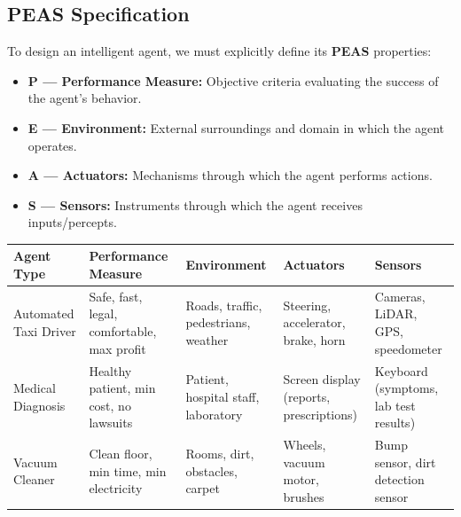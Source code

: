 \documentclass[12pt,a4paper]{article}
\renewcommand{\arraystretch}{1.45}
\begin{document}
\begin{tcolorbox}[tikzbox, title={Agent-Environment Interaction Loop}]
\centering
{}
\end{tcolorbox}

\subsection{PEAS Specification}
To design an intelligent agent, we must explicitly define its \textbf{PEAS} properties:
\begin{itemize}[leftmargin=*, itemsep=3pt]
  \item \textbf{P --- Performance Measure:} Objective criteria evaluating the success of the agent's behavior.
  \item \textbf{E --- Environment:} External surroundings and domain in which the agent operates.
  \item \textbf{A --- Actuators:} Mechanisms through which the agent performs actions.
  \item \textbf{S --- Sensors:} Instruments through which the agent receives inputs/percepts.
\end{itemize}

\par\vspace{6pt}\noindent
{\renewcommand{\arraystretch}{1.4}%
\begin{tabularx}{\linewidth}{|B{2.8cm}|Y|Y|Y|Y|}
\hline
\textbf{Agent Type} & \textbf{Performance Measure} & \textbf{Environment} & \textbf{Actuators} & \textbf{Sensors} \\
\hline
Automated Taxi Driver & Safe, fast, legal, comfortable, max profit & Roads, traffic, pedestrians, weather & Steering, accelerator, brake, horn & Cameras, LiDAR, GPS, speedometer \\
\hline
Medical Diagnosis & Healthy patient, min cost, no lawsuits & Patient, hospital staff, laboratory & Screen display (reports, prescriptions) & Keyboard (symptoms, lab test results) \\
\hline
Vacuum Cleaner & Clean floor, min time, min electricity & Rooms, dirt, obstacles, carpet & Wheels, vacuum motor, brushes & Bump sensor, dirt detection sensor \\
\hline
\end{tabularx}}
\end{document}
